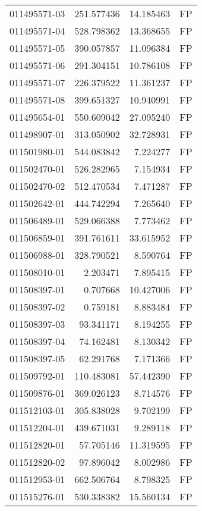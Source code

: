 \begin{tabular}{lrrl}
011495571-03 &  251.577436 &    14.185463 &   FP \\
011495571-04 &  528.798362 &    13.368655 &   FP \\
011495571-05 &  390.057857 &    11.096384 &   FP \\
011495571-06 &  291.304151 &    10.786108 &   FP \\
011495571-07 &  226.379522 &    11.361237 &   FP \\
011495571-08 &  399.651327 &    10.940991 &   FP \\
011495654-01 &  550.609042 &    27.095240 &   FP \\
011498907-01 &  313.050902 &    32.728931 &   FP \\
011501980-01 &  544.083842 &     7.224277 &   FP \\
011502470-01 &  526.282965 &     7.154934 &   FP \\
011502470-02 &  512.470534 &     7.471287 &   FP \\
011502642-01 &  444.742294 &     7.265640 &   FP \\
011506489-01 &  529.066388 &     7.773462 &   FP \\
011506859-01 &  391.761611 &    33.615952 &   FP \\
011506988-01 &  328.790521 &     8.590764 &   FP \\
011508010-01 &    2.203471 &     7.895415 &   FP \\
011508397-01 &    0.707668 &    10.427006 &   FP \\
011508397-02 &    0.759181 &     8.883484 &   FP \\
011508397-03 &   93.341171 &     8.194255 &   FP \\
011508397-04 &   74.162481 &     8.130342 &   FP \\
011508397-05 &   62.291768 &     7.171366 &   FP \\
011509792-01 &  110.483081 &    57.442390 &   FP \\
011509876-01 &  369.026123 &     8.714576 &   FP \\
011512103-01 &  305.838028 &     9.702199 &   FP \\
011512204-01 &  439.671031 &     9.289118 &   FP \\
011512820-01 &   57.705146 &    11.319595 &   FP \\
011512820-02 &   97.896042 &     8.002986 &   FP \\
011512953-01 &  662.506764 &     8.798325 &   FP \\
011515276-01 &  530.338382 &    15.560134 &   FP \\

\end{tabular}
